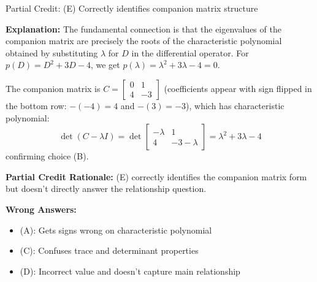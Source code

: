 \documentclass[12pt]{amsart}
\newcommand{\partcred}[1]{{\color{partialblue}#1}}
\begin{document}
\partcred{Partial Credit: (E) Correctly identifies companion matrix structure}

\textbf{Explanation:} The fundamental connection is that the eigenvalues of the companion matrix are precisely the roots of the characteristic polynomial obtained by substituting $\lambda$ for $D$ in the differential operator. For $p(D) = D^2 + 3D - 4$, we get $p(\lambda) = \lambda^2 + 3\lambda - 4 = 0$. 

The companion matrix is $C = \begin{bmatrix} 0 & 1 \\ 4 & -3 \end{bmatrix}$ (coefficients appear with sign flipped in the bottom row: $-(-4) = 4$ and $-(3) = -3$), which has characteristic polynomial:
$$\det(C - \lambda I) = \det\begin{bmatrix} -\lambda & 1 \\ 4 & -3-\lambda \end{bmatrix} = \lambda^2 + 3\lambda - 4$$
confirming choice (B).

\textbf{Partial Credit Rationale:} (E) correctly identifies the companion matrix form but doesn't directly answer the relationship question.

\textbf{Wrong Answers:}
\begin{itemize}
\item (A): Gets signs wrong on characteristic polynomial
\item (C): Confuses trace and determinant properties
\item (D): Incorrect value and doesn't capture main relationship
\end{itemize}
\end{document}
